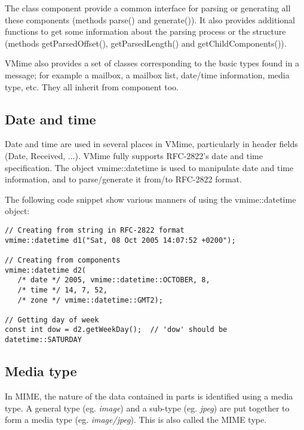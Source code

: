 The class component provide a common interface for parsing or generating all
these components (methods {\vcode parse()} and {\vcode generate()}). It also
provides additional functions to get some information about the parsing
process or the structure (methods {\vcode getParsedOffset()},
{\vcode getParsedLength()} and {\vcode getChildComponents()}).

VMime also provides a set of classes corresponding to the basic types found
in a message; for example a mailbox, a mailbox list, date/time information,
media type, etc. They all inherit from {\vcode component} too.

\subsection{Date and time} %

Date and time are used in several places in VMime, particularly in header
fields (Date, Received, ...). VMime fully supports RFC-2822's date and time
specification. The object {\vcode vmime::datetime} is used to manipulate date
and time information, and to parse/generate it from/to RFC-2822 format.

The following code snippet show various manners of using the
{\vcode vmime::datetime} object:

\begin{lstlisting}[caption={Using {\vcode vmime::datetime} object}]
// Creating from string in RFC-2822 format
vmime::datetime d1("Sat, 08 Oct 2005 14:07:52 +0200");

// Creating from components
vmime::datetime d2(
   /* date */ 2005, vmime::datetime::OCTOBER, 8,
   /* time */ 14, 7, 52,
   /* zone */ vmime::datetime::GMT2);

// Getting day of week
const int dow = d2.getWeekDay();  // 'dow' should be datetime::SATURDAY
\end{lstlisting}

\subsection{Media type} %

In MIME, the nature of the data contained in parts is identified using a
media type. A general type (eg. \emph{image}) and a sub-type (eg. \emph{jpeg})
are put together to form a media type (eg. \emph{image/jpeg}). This is also
called the MIME type.

